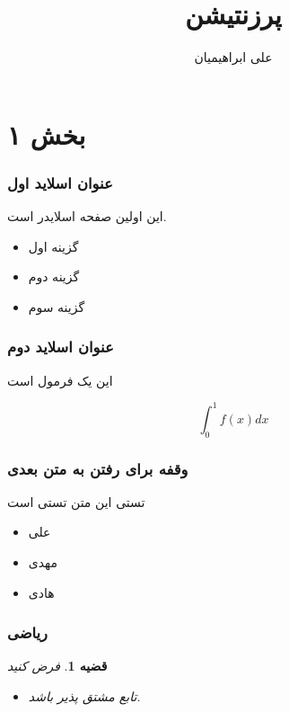 \documentclass[xcolor=dvipsnames,professionalfonts]{beamer}
\author{علی ابراهیمیان}
\title{پرزنتیشن}
\institute{دانشگاه آزاد اسلامی}
\newtheorem{thm}{قضیه}
\begin{document}
    \section{بخش ۱}
    \frame{\maketitle}
    \begin{frame}
        \frametitle{عنوان اسلاید اول}
        \begin{block}

            
        این اولین صفحه اسلایدر است.
    
            \begin{itemize}\raggedright
            \item گزینه اول
            \item گزینه دوم
            \item گزینه سوم
            \end{itemize}
        \end{block}
    \end{frame}

    \begin{frame}
        \frametitle{عنوان اسلاید دوم}
        \begin{block}

            این یک فرمول است

            \[
            \int_{0}^{1}{f(x)}dx
            \]
        \end{block}
    \end{frame}

    \begin{frame}
        \frametitle{وقفه برای رفتن به  متن بعدی}
        \begin{block}{تستی}
            این متن تستی است
        \begin{itemize}
            \item علی
            \item مهدی
            \pause
            \item هادی
            \pause
            
        \end{itemize}
        \end{block}
    \end{frame}

    \begin{frame}
        \frametitle{ریاضی}
        \begin{thm}
        فرض کنید
        \begin{itemize}\raggedright
            \item تابع مشتق پذیر باشد.
        \end{itemize}
        \end{thm}
    \end{frame}
\end{document}
